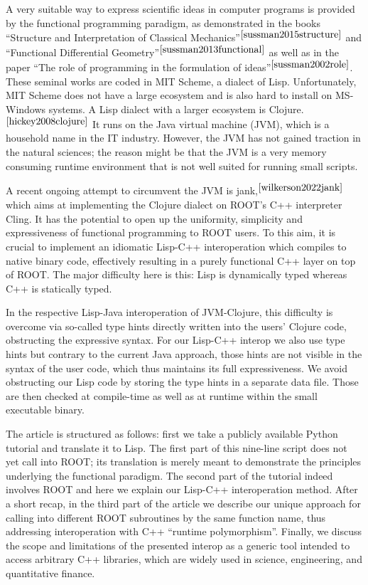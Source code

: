 \documentclass[twocolumn]{article}
\begin{document}
A very suitable way to express scientific ideas in computer programs is provided by the functional programming paradigm, as demonstrated in the books “Structure and Interpretation of Classical Mechanics”$^{\cite{sussman2015structure}}$ and “Functional Differential Geometry”$^{\cite{sussman2013functional}}$ as well as in the paper “The role of programming in the formulation of ideas”$^{\cite{sussman2002role}}$. These seminal works are coded in MIT Scheme, a dialect of Lisp. Unfortunately, MIT Scheme does not have a large ecosystem and is also hard to install on MS-Windows systems. A Lisp dialect with a larger ecosystem is Clojure.$^{\cite{hickey2008clojure}}$ It runs on the Java virtual machine (JVM), which is a household name in the IT industry. However, the JVM has not gained traction in the natural sciences; the reason might be that the JVM is a very memory consuming runtime environment that is not well suited for running small scripts.

A recent ongoing attempt to circumvent the JVM is jank,$^{\cite{wilkerson2022jank}}$ which aims at implementing the Clojure dialect on ROOT’s C++ interpreter Cling. It has the potential to open up the uniformity, simplicity and expressiveness of functional programming to ROOT users. To this aim, it is crucial to implement an idiomatic Lisp-C++ interoperation which compiles to native binary code, effectively resulting in a purely functional C++ layer on top of ROOT. The major difficulty here is this: Lisp is dynamically typed whereas C++ is statically typed.

In the respective Lisp-Java interoperation of JVM-Clojure, this difficulty is overcome via so-called type hints directly written into the users’ Clojure code, obstructing the expressive syntax. For our Lisp-C++ interop we also use type hints but contrary to the current Java approach, those hints are not visible in the syntax of the user code, which thus maintains its full expressiveness. We avoid obstructing our Lisp code by storing the type hints in a separate data file. Those are then checked at compile-time as well as at runtime within the small executable binary.

The article is structured as follows: first we take a publicly available Python tutorial and translate it to Lisp. The first part of this nine-line script does not yet call into ROOT; its translation is merely meant to demonstrate the principles underlying the functional paradigm. The second part of the tutorial indeed involves ROOT and here we explain our Lisp-C++ interoperation method. After a short recap, in the third part of the article we describe our unique approach for calling into different ROOT subroutines by the same function name, thus addressing interoperation with C++ “runtime polymorphism”. Finally, we discuss the scope and limitations of the presented interop as a generic tool intended to access arbitrary C++ libraries, which are widely used in science, engineering, and quantitative finance.
\end{document}
